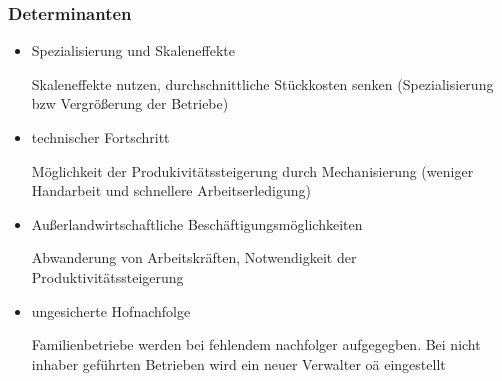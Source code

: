 \documentclass[11pt]{article}
\begin{document}
\subsubsection{Determinanten}
\begin{itemize}
	\item{Spezialisierung und Skaleneffekte}

		Skaleneffekte nutzen, durchschnittliche Stückkosten senken (Spezialisierung bzw Vergrößerung der Betriebe)
	\item{technischer Fortschritt}

		Möglichkeit der Produkivitätssteigerung durch Mechanisierung (weniger Handarbeit und schnellere Arbeitserledigung)
	\item{Außerlandwirtschaftliche Beschäftigungsmöglichkeiten}

		Abwanderung von Arbeitskräften, Notwendigkeit der Produktivitätssteigerung
	\item{ungesicherte Hofnachfolge}

		Familienbetriebe werden bei fehlendem nachfolger aufgegegben. Bei nicht inhaber geführten Betrieben wird ein neuer Verwalter oä eingestellt

\end{itemize}
\end{document}
